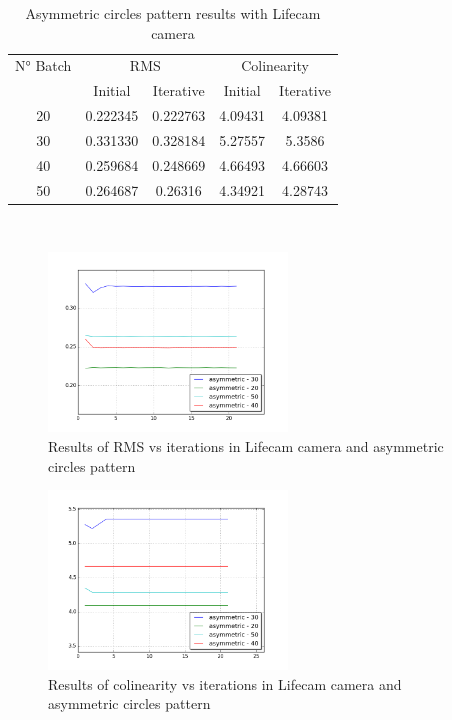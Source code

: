 \documentclass[journal]{IEEEtran}
\begin{document}
\begin{table}[h]
\centering
\caption{Asymmetric circles pattern results with Lifecam camera}
\begin{tabular}{ |c||c|c|c|c|  }
 \hline
 N° Batch & \multicolumn{2}{c|}{RMS} & \multicolumn{2}{c|}{Colinearity}\\
 \cline{2-5}
 & Initial & Iterative & Initial & Iterative \\
 \hline
 20        & 0.222345 & 0.222763 & 4.09431 & 4.09381 \\
 30        & 0.331330 & 0.328184 & 5.27557 & 5.3586 \\
 40        & 0.259684 & 0.248669 & 4.66493 & 4.66603 \\
 50        & 0.264687 & 0.26316 & 4.34921 & 4.28743 \\
 \hline
\end{tabular}
\\
\end{table}

\begin{figure}[H]
\centering
\includegraphics[width=2.5in]{_img/report_4/img_results_lifecam_asymmetric.png}
\caption{Results of RMS vs iterations in Lifecam camera and asymmetric circles pattern}
\end{figure}

\begin{figure}[H]
\centering
\includegraphics[width=2.5in]{_img/report_4/img_results_lifecam_colinearity_asymmetric.png}
\caption{Results of colinearity vs iterations in Lifecam camera and asymmetric circles pattern}
\end{figure}
\end{document}
